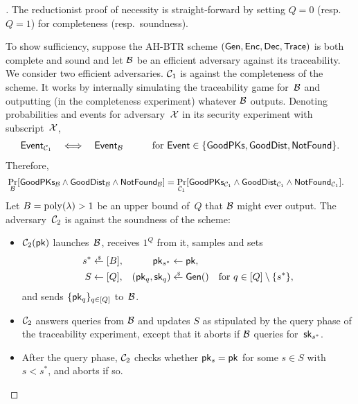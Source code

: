 \begin{proof}[]
The reductionist proof of necessity is straight-forward by setting ${Q=0}$ (resp.~${Q=1}$) for completeness (resp.~soundness).

To show sufficiency, suppose the AH-BTR scheme $(\Gen,\Enc,\Dec,\Trace)$ is both complete and sound and let ${\mathcal{B}}$ be an efficient adversary against its traceability.
We consider two efficient adversaries.
${\mathcal{C}}_1$ is against the completeness of the scheme.
It works by internally simulating the traceability game for~${\mathcal{B}}$ and outputting (in the completeness experiment) whatever ${\mathcal{B}}$ outputs.
Denoting probabilities and events for adversary~${\mathcal{X}}$ in its security experiment with subscript~${\mathcal{X}}$,
\begin{align*}
\mathsf{Event}_{\scriptC_1}
\quad\Longleftrightarrow\quad
\mathsf{Event}_\scriptB
\quad\qquad
\textup{for }\mathsf{Event}\in{\{\GoodPKs,\GoodDist,\NotFound\}}.
\end{align*}
Therefore,
\begin{align*}
&\Pr_\scriptB[\GoodPKs_\scriptB\wedge\GoodDist_\scriptB\wedge\NotFound_\scriptB]
\WideNarrow{}{\\&\qquad{}}=
\Pr_{\scriptC_1}
[\GoodPKs_{\scriptC_1}\wedge\GoodDist_{\scriptC_1}\wedge\NotFound_{\scriptC_1}].
\end{align*}
Let ${B=\operatorname{poly}(\lambda)>1}$ be an upper bound of~$Q$ that ${\mathcal{B}}$ might ever output.
The adversary~${\mathcal{C}}_2$ is against the soundness of the scheme:
\begin{itemize}
\item $\scriptC_2(\pk)$ launches~${\mathcal{B}}$, receives $1^Q$ from it,
samples and sets
\begin{align*}
s^\ast&{}\draws[B],&
\pk_{s^\ast}&{}\gets\pk,\\
S&{}\gets[Q],&
(\pk_q,\sk_q)&{}\draws\Gen()\quad\textup{for }q\in{[Q]\setminus{\{s^\ast\}}},
\end{align*}
and sends $\{\pk_q\}_{q\in[Q]}$ to~${\mathcal{B}}$.
\item ${\mathcal{C}}_2$ answers queries from ${\mathcal{B}}$ and updates $S$ as stipulated by the query phase of the traceability experiment, except that it aborts if ${\mathcal{B}}$ queries for~$\sk_{s^\ast}$.
\item After the query phase,
${\mathcal{C}}_2$ checks whether ${\pk_s=\pk}$ for some ${s\in S}$ with ${s<s^\ast}$,
and aborts if so.

\end{itemize}
\end{proof}
